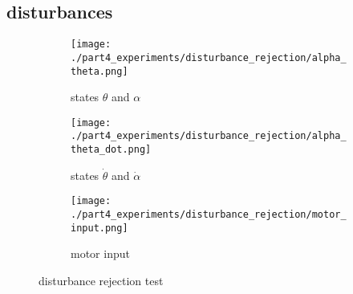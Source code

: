 \subsection{disturbances}
	\begin{figure}[H]
		\centering
		\begin{subfigure}[b]{0.45\textwidth}
			\texttt{[image: ./part4\_experiments/disturbance\_rejection/alpha\_theta.png]}
			\caption{states $\theta$ and $\alpha$}
		\end{subfigure}
		\begin{subfigure}[b]{0.45\textwidth}
			\texttt{[image: ./part4\_experiments/disturbance\_rejection/alpha\_theta\_dot.png]}
			\caption{states $\dot{\theta}$ and $\dot{\alpha}$}
		\end{subfigure}
		\begin{subfigure}[b]{0.45\textwidth}
			\texttt{[image: ./part4\_experiments/disturbance\_rejection/motor\_input.png]}
			\caption{motor input}
		\end{subfigure}
		\caption{disturbance rejection test}
	\end{figure}